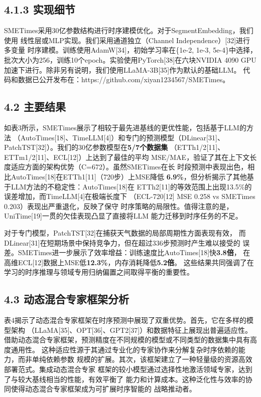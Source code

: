 \documentclass[
  10
]{article}
\begin{document}
\subsection{4.1.3 实现细节}\label{implementation-details}

SMETimes采用30亿参数结构进行时序建模优化。对于SegmentEmbedding，我们使用
线性层或MLP实现。我们采用通道独立（Channel Independence）{[}32{]}进行多变量
时序建模。训练使用AdamW{[}34{]}，初始学习率在\{1e-2, 1e-3, 5e-4\}中选择，
批次大小为256，训练10个epoch。实验使用PyTorch{[}38{]}在六块NVIDIA 4090 GPU
加速下进行。除非另有说明，我们使用LLaMA-3B{[}35{]}作为默认的基础LLM。
代码和数据已公开发布在：https://github.com/xiyan1234567/SMETimes。

\subsection{4.2 主要结果}\label{main-results}

如表3所示，SMETimes展示了相较于最先进基线的更优性能，包括基于LLM的方法
（AutoTimes{[}18{]}、TimeLLM{[}4{]}）和专门的预测模型（DLinear{[}31{]}、
PatchTST{[}32{]}）。我们的30亿参数模型在\textbf{5/7个数据集}
（ETTh1/2{[}11{]}、ETTm1/2{[}11{]}、ECL{[}12{]}）上达到了最佳的平均
MSE/MAE，验证了其在上下文长度适应方面的架构优势（C=672）。虽然SMETimes在长
时段预测中表现出色，相比AutoTimes{[}18{]}在ETTh1{[}11{]}（720步）上MSE降低
\textbf{6.9\%}，但分析揭示了其他基于LLM方法的不稳定性：AutoTimes{[}18{]}在
ETTh2{[}11{]}的等效范围上出现13.5\%的误差增加，而TimeLLM{[}4{]}在极端长度下
（ECL-720{[}12{]} MSE 0.258 vs SMETimes 0.203）表现出严重退化，反映了保守
时序策略的局限性。值得注意的是，UniTime{[}19{]}一贯的欠佳表现凸显了直接将LLM
能力迁移到时序任务的不足。

对于专门模型，PatchTST{[}32{]}在捕获天气数据的局部周期性方面表现有效，
而DLinear{[}31{]}在短期场景中保持竞争力，但在超过336步预测时产生难以接受的
误差。SMETimes进一步展示了效率增益：训练速度比AutoTimes{[}18{]}快\textbf{3.8倍}，
在高维ECL{[}12{]}数据上MSE低\textbf{12.3\%}，内存消耗降低\textbf{5.2倍}。
这些结果共同强调了在学习的时序推理与领域专用归纳偏置之间取得平衡的重要性。

\subsection{4.3 动态混合专家框架分析}\label{dynamic-mixture-of-experts-framework-analysis}

表4揭示了动态混合专家框架在时序预测中展现了双重优势。首先，它在多样的模型架构
（LLaMA{[}35{]}、OPT{[}36{]}、GPT2{[}37{]}）和数据特征上展现出普遍适应性。
借助动态混合专家框架，预测精度在不同规模的模型或不同类型的数据集中具有高度通用性。
这种适应性源于其通过专业化的专家协作来分解复杂时序依赖的能力，而非单纯依赖参数
规模的扩展。其次，该框架建立了一种轻量级的资源高效部署范式。集成动态混合专家
框架的较小模型通过选择性地激活领域专家，达到了与较大基线相当的性能，有效平衡了
能力和计算成本。这种泛化性与效率的协同使得动态混合专家框架成为可扩展时序智能的
战略推动者。
\end{document}
